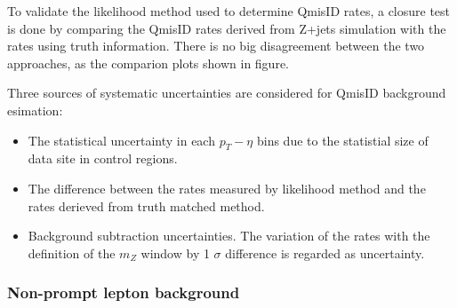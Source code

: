To validate the likelihood method used to determine QmisID rates, a closure test is done by comparing the QmisID rates derived from Z+jets simulation with the rates using truth information. There is no big disagreement between the two approaches, as the comparion plots shown in figure.


Three sources of systematic uncertainties are considered for QmisID background esimation:
\begin{itemize}
\item The statistical uncertainty in each $p_T-\eta$ bins due to the statistial size of data site in control regions.
\item The difference between the rates measured by likelihood method and the rates derieved from truth matched method.
\item Background subtraction uncertainties. The variation of the rates with the definition of the $m_Z$ window by 1 $\sigma$ difference is regarded as uncertainty.
\end{itemize}

\subsubsection{Non-prompt lepton background}{}

